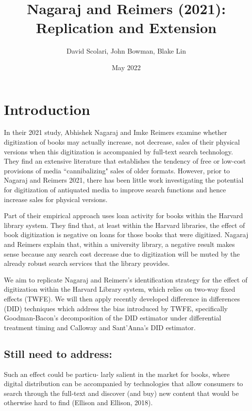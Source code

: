 \documentclass{article}
\author{David Scolari, John Bowman, Blake Lin}
\title{Nagaraj and Reimers (2021): Replication and Extension}
\date{May 2022}
\begin{document}
\maketitle

\begin{abstract}
\end{abstract}

\section{Introduction}

In their 2021 study, Abhishek Nagaraj and Imke Reimers examine whether digitization of books may actually increase, not decrease, sales of their physical versions when this digitization is accompanied by full-text search technology. They find an extensive literature that establishes the tendency of free or low-cost provisions of media ``cannibalizing" sales of older formats. However, prior to Nagaraj and Reimers 2021, there has been little work investigating the potential for digitization of antiquated media to improve search functions and hence increase sales for physical versions. 

Part of their empirical approach uses loan activity for books within the Harvard library system. They find that, at least within the Harvard libraries, the effect of book digitization is negative on loans for those books that were digitized. Nagaraj and Reimers explain that, within a university library, a negative result makes sense because any search cost decrease due to digitization will be muted by the already robust search services that the library provides. 

We aim to replicate Nagaraj and Reimers's identification strategy for the effect of digitization within the Harvard Library system, which relies on two-way fixed effects (TWFE). We will then apply recently developed difference in differences (DID) techniques which address the bias introduced by TWFE, specifically Goodman-Bacon's decomposition of the DID estimator under differential treatment timing and Calloway and Sant'Anna's DID estimator. 

 
\subsection{Still need to address:}
Such an effect could be particu- larly salient in the market for books, where digital distribution can be accompanied by technologies that allow consumers to search through the full-text and discover (and buy) new content that would be otherwise hard to find (Ellison and Ellison, 2018).
\end{document}
